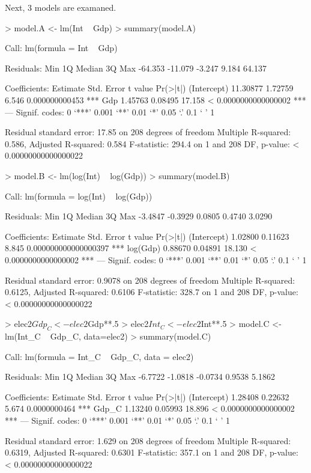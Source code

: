 \documentclass{article}
\begin{document}
Next, 3 models are examaned.

\begin{Schunk}
\begin{Sinput}
> model.A <- lm(Int ~ Gdp)
> summary(model.A)
\end{Sinput}
\begin{Soutput}
Call:
lm(formula = Int ~ Gdp)

Residuals:
    Min      1Q  Median      3Q     Max 
-64.353 -11.079  -3.247   9.184  64.137 

Coefficients:
            Estimate Std. Error t value             Pr(>|t|)    
(Intercept) 11.30877    1.72759   6.546       0.000000000453 ***
Gdp          1.45763    0.08495  17.158 < 0.0000000000000002 ***
---
Signif. codes:  0 ‘***’ 0.001 ‘**’ 0.01 ‘*’ 0.05 ‘.’ 0.1 ‘ ’ 1

Residual standard error: 17.85 on 208 degrees of freedom
Multiple R-squared:  0.586,	Adjusted R-squared:  0.584 
F-statistic: 294.4 on 1 and 208 DF,  p-value: < 0.00000000000000022
\end{Soutput}
\begin{Sinput}
> model.B <- lm(log(Int) ~ log(Gdp))
> summary(model.B)
\end{Sinput}
\begin{Soutput}
Call:
lm(formula = log(Int) ~ log(Gdp))

Residuals:
    Min      1Q  Median      3Q     Max 
-3.4847 -0.3929  0.0805  0.4740  3.0290 

Coefficients:
            Estimate Std. Error t value             Pr(>|t|)    
(Intercept)  1.02800    0.11623   8.845 0.000000000000000397 ***
log(Gdp)     0.88670    0.04891  18.130 < 0.0000000000000002 ***
---
Signif. codes:  0 ‘***’ 0.001 ‘**’ 0.01 ‘*’ 0.05 ‘.’ 0.1 ‘ ’ 1

Residual standard error: 0.9078 on 208 degrees of freedom
Multiple R-squared:  0.6125,	Adjusted R-squared:  0.6106 
F-statistic: 328.7 on 1 and 208 DF,  p-value: < 0.00000000000000022
\end{Soutput}
\begin{Sinput}
> elec2$Gdp_C <- elec2$Gdp**.5
> elec2$Int_C <- elec2$Int**.5
> model.C <- lm(Int_C ~ Gdp_C, data=elec2)
> summary(model.C)                     
\end{Sinput}
\begin{Soutput}
Call:
lm(formula = Int_C ~ Gdp_C, data = elec2)

Residuals:
    Min      1Q  Median      3Q     Max 
-6.7722 -1.0818 -0.0734  0.9538  5.1862 

Coefficients:
            Estimate Std. Error t value             Pr(>|t|)    
(Intercept)  1.28408    0.22632   5.674         0.0000000464 ***
Gdp_C        1.13240    0.05993  18.896 < 0.0000000000000002 ***
---
Signif. codes:  0 ‘***’ 0.001 ‘**’ 0.01 ‘*’ 0.05 ‘.’ 0.1 ‘ ’ 1

Residual standard error: 1.629 on 208 degrees of freedom
Multiple R-squared:  0.6319,	Adjusted R-squared:  0.6301 
F-statistic: 357.1 on 1 and 208 DF,  p-value: < 0.00000000000000022
\end{Soutput}
\end{Schunk}
\end{document}
